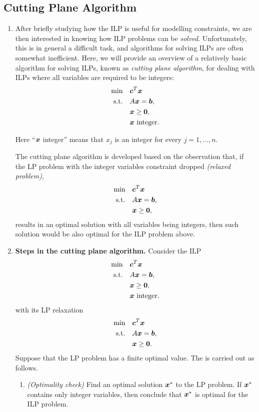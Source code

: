 \subsection{Cutting Plane Algorithm}
\begin{enumerate}
\item After briefly studying how the ILP is useful for modelling constraints,
we are then interested in knowing how ILP problems can be \emph{solved}.
Unfortunately, this is in general a difficult task, and algorithms for solving
ILPs are often somewhat inefficient. Here, we will provide an overview of a
relatively basic algorithm for solving ILPs, known as \emph{cutting plane
algorithm}, for dealing with ILPs where all variables are required to be
integers:
\begin{align*}
\text{min}\quad&\bm{c}^{T}\bm{x} \\
\text{s.t.}\quad&A\bm{x}=\bm{b}, \\
&\bm{x}\ge\bm{0}, \\
&\text{\(\bm{x}\) integer.}
\end{align*}
\begin{note}
Here ``\(\bm{x}\) integer'' means that \(x_j\) is an integer for every
\(j=1,\dotsc,n\).
\end{note}

The cutting plane algorithm is developed based on the observation that, if the
LP problem with the integer variables constraint dropped \emph{(relaxed
problem)},
\begin{align*}
\text{min}\quad&\bm{c}^{T}\bm{x} \\
\text{s.t.}\quad&A\bm{x}=\bm{b}, \\
&\bm{x}\ge\bm{0},
\end{align*}
results in an optimal solution with all variables being integers, then such
solution would be also optimal for the ILP problem above.
\item\label{it:cut-plane-algo} \textbf{Steps in the cutting plane algorithm.}
Consider the ILP
\begin{align*}
\text{min}\quad&\bm{c}^{T}\bm{x} \\
\text{s.t.}\quad&A\bm{x}=\bm{b}, \\
&\bm{x}\ge\bm{0}, \\
&\text{\(\bm{x}\) integer.}
\end{align*}
with its LP relaxation
\begin{align*}
\text{min}\quad&\bm{c}^{T}\bm{x} \\
\text{s.t.}\quad&A\bm{x}=\bm{b}, \\
&\bm{x}\ge\bm{0}.
\end{align*}
Suppose that the LP problem has a finite optimal value.
The  is carried out as follows.
\begin{enumerate}[label={(\arabic*)}]
\item \emph{(Optimality check)} Find an optimal solution \(\bm{x}^{*}\) to
the LP problem. If \(\bm{x}^{*}\) contains only integer variables, then
conclude that \(\bm{x}^{*}\) is optimal for the ILP problem.


\end{enumerate}
\end{enumerate}
